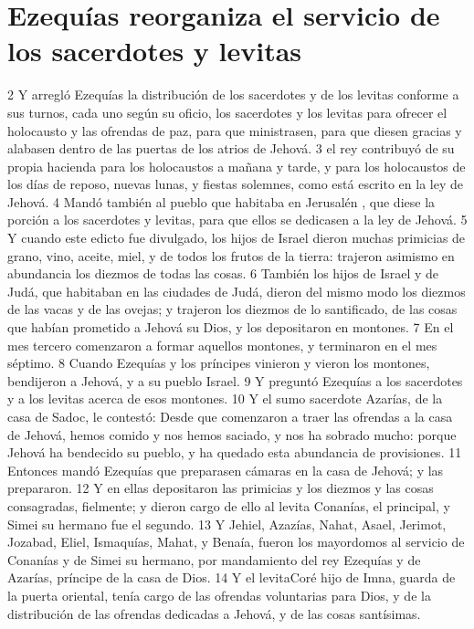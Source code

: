 \section*{Ezequías reorganiza el servicio de los sacerdotes y levitas}

2 Y arregló Ezequías la distribución de los sacerdotes y de los levitas conforme a sus turnos, cada uno según su oficio, los sacerdotes y los levitas para ofrecer el holocausto y las ofrendas de paz, para que ministrasen, para que diesen gracias y alabasen dentro de  las puertas de los atrios de Jehová.
3 el rey contribuyó de su propia hacienda para los holocaustos a mañana y tarde, y para los holocaustos de los días de reposo, nuevas lunas, y fiestas solemnes, como está escrito en la ley de Jehová. 
4 Mandó también al pueblo que habitaba en Jerusalén , que diese la porción a los sacerdotes y levitas, para que ellos se dedicasen a la ley de Jehová.
5 Y cuando este edicto fue divulgado, los hijos de Israel dieron muchas primicias de grano, vino, aceite, miel, y de todos los frutos de la tierra: trajeron asimismo en abundancia los diezmos de todas las cosas. 
6 También los hijos de Israel y de Judá, que habitaban en las ciudades de Judá, dieron del mismo modo los diezmos de las vacas y de las ovejas; y trajeron los diezmos de lo santificado, de las cosas que habían prometido a Jehová su Dios, y los depositaron en montones.
7 En el mes tercero comenzaron a formar aquellos montones, y terminaron en el mes séptimo.
8 Cuando Ezequías y los príncipes vinieron y vieron los montones, bendijeron a Jehová, y a su pueblo Israel.
9 Y preguntó Ezequías a los sacerdotes y a los levitas acerca de esos montones.
10 Y  el sumo sacerdote Azarías, de la casa de Sadoc, le contestó: Desde que comenzaron a traer las ofrendas a la casa de Jehová, hemos comido y nos hemos saciado, y nos ha sobrado mucho: porque Jehová ha bendecido su pueblo, y ha quedado esta abundancia de provisiones.
11 Entonces mandó Ezequías que preparasen cámaras en la casa de Jehová; y las prepararon.
12 Y en ellas depositaron las primicias y los diezmos y las cosas consagradas, fielmente; y dieron cargo de ello al levita Conanías, el principal, y Simei su hermano fue el segundo.
13 Y Jehiel, Azazías, Nahat, Asael, Jerimot, Jozabad, Eliel, Ismaquías, Mahat, y Benaía, fueron los mayordomos al servicio de Conanías y de Simei su hermano, por mandamiento del rey Ezequías y de Azarías, príncipe de la casa de Dios.
14 Y el levitaCoré hijo de Imna, guarda de la puerta oriental, tenía cargo de las ofrendas voluntarias para Dios, y de la distribución de las ofrendas dedicadas a Jehová, y de las cosas santísimas.
